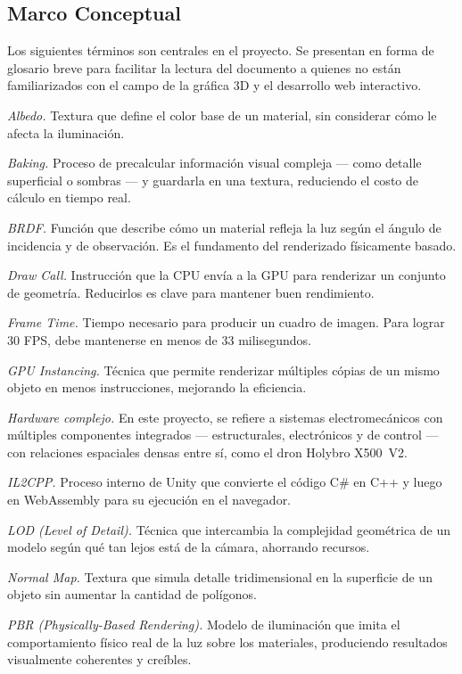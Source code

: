 \subsection{Marco Conceptual}

Los siguientes t\'erminos son centrales en el proyecto. Se presentan en forma de glosario breve para facilitar la lectura del documento a quienes no est\'an familiarizados con el campo de la gr\'afica 3D y el desarrollo web interactivo.

\textit{Albedo.} Textura que define el color base de un material, sin considerar c\'omo le afecta la iluminaci\'on.

\textit{Baking.} Proceso de precalcular informaci\'on visual compleja — como detalle superficial o sombras — y guardarla en una textura, reduciendo el costo de c\'alculo en tiempo real.

\textit{BRDF.} Funci\'on que describe c\'omo un material refleja la luz seg\'un el \'angulo de incidencia y de observaci\'on. Es el fundamento del renderizado f\'isicamente basado.

\textit{Draw Call.} Instrucci\'on que la CPU env\'ia a la GPU para renderizar un conjunto de geometr\'ia. Reducirlos es clave para mantener buen rendimiento.

\textit{Frame Time.} Tiempo necesario para producir un cuadro de imagen. Para lograr 30 FPS, debe mantenerse en menos de 33 milisegundos.

\textit{GPU Instancing.} T\'ecnica que permite renderizar m\'ultiples c\'opias de un mismo objeto en menos instrucciones, mejorando la eficiencia.

\textit{Hardware complejo.} En este proyecto, se refiere a sistemas electromec\'anicos con m\'ultiples componentes integrados — estructurales, electr\'onicos y de control — con relaciones espaciales densas entre s\'i, como el dron Holybro X500~V2.

\textit{IL2CPP.} Proceso interno de Unity que convierte el c\'odigo C\# en C++ y luego en WebAssembly para su ejecuci\'on en el navegador.

\textit{LOD (Level of Detail).} T\'ecnica que intercambia la complejidad geom\'etrica de un modelo seg\'un qu\'e tan lejos est\'a de la c\'amara, ahorrando recursos.

\textit{Normal Map.} Textura que simula detalle tridimensional en la superficie de un objeto sin aumentar la cantidad de pol\'igonos.

\textit{PBR (Physically-Based Rendering).} Modelo de iluminaci\'on que imita el comportamiento f\'isico real de la luz sobre los materiales, produciendo resultados visualmente coherentes y cre\'ibles.

